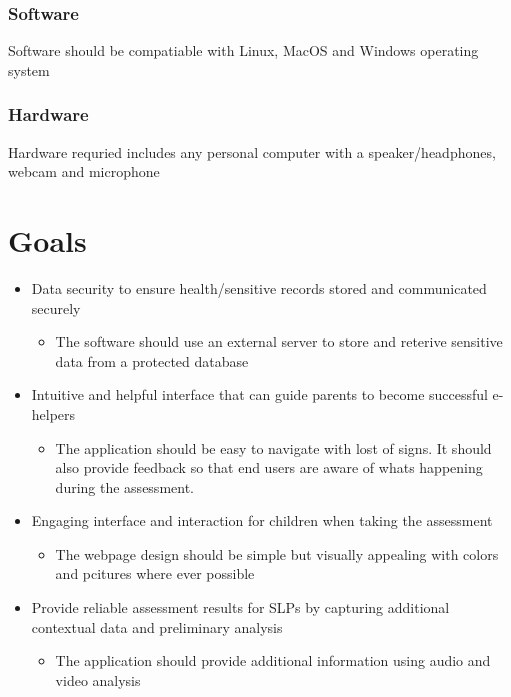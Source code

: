 \documentclass{article}
\begin{document}
\subsubsection{Software}
Software should be compatiable with Linux, MacOS and Windows operating system
\subsubsection{Hardware}
Hardware requried includes any personal computer with a speaker/headphones, webcam and microphone\\

\section{Goals}
\begin{itemize}
    \item Data security to ensure health/sensitive records stored and communicated securely
    \begin{itemize}
        \item The software should use an external server to store and reterive sensitive data from a protected database
    \end{itemize}
    
    \item Intuitive and helpful interface that can guide parents to become successful e-helpers
    \begin{itemize}
        \item The application should be easy to navigate with lost of signs. It should also provide feedback so that end users are aware of whats happening during the assessment.
    \end{itemize}
    
    \item Engaging interface and interaction for children when taking the assessment
    \begin{itemize}
        \item The webpage design should be simple but visually appealing with colors and pcitures where ever possible 
    \end{itemize}
    
    \item Provide reliable assessment results for SLPs by capturing additional contextual data and preliminary analysis
    \begin{itemize}
        \item The application should provide additional information using audio and video analysis
    \end{itemize}

\end{itemize}
\end{document}
